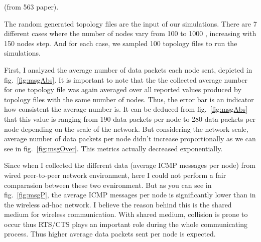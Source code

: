 (from 563 paper).

The random generated topology files are the input of our simulations. There are 7 different cases where the number of nodes vary from 100 to 1000 , increasing with 150 nodes step. And for each case, we sampled 100 topology files to run the simulations.

First, I analyzed the average number of data packets each node sent, depicted in fig.~\ref{fig:msgAbs}. It is important to note that the the collected average number for one topology file was again averaged over all reported values produced by topology files with the same number of nodes. Thus, the error bar is an indicator how consistent the average number is. It can be deduced from fig.~\ref{fig:msgAbs} that this value is ranging from 190 data packets per node to 280 data packets per node depending on the scale of the network. But considering the network scale, average number of data packets per node didn't increase proportionally as we can see in fig.~\ref{fig:msgOver}. This metrics actually decreased exponentially. 

%
%

Since when I collected the different data (average ICMP messages per node) from wired peer-to-peer network environment, here I could not perform a fair comparasion between these two evnironment. But as you can see in fig.~\ref{fig:msgP}, the average ICMP messages per node is significantly lower than in the wireless ad-hoc network. I believe the reason behind this is the shared medium for wireless communication. With shared medium, collision is prone to occur thus RTS/CTS plays an important role during the whole communicating process. Thus higher average data packets sent per node is expected.

